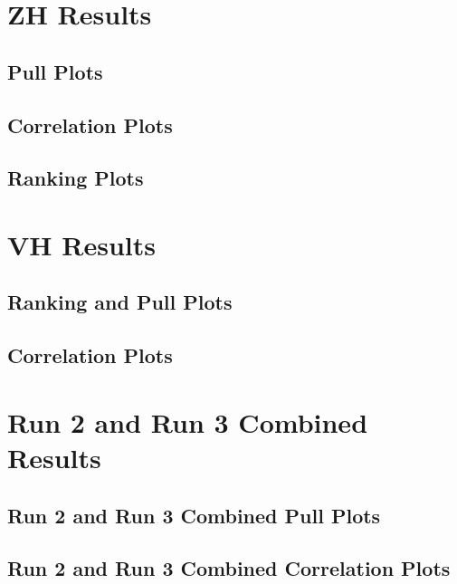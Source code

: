 \documentclass{umassthesis}          %
\begin{document}
\chapter{ZH Results}\label{app:zh_results_appendix}
\section{Pull Plots}\label{app:zh_pull_plots}

\section{Correlation Plots}\label{app:zh_correlation_plots}

\section{Ranking Plots}\label{app:zh_ranking_plots}

% 

\chapter{VH Results}\label{app:vh_results_appendix}
\section{Ranking and Pull Plots}\label{app:vh_pull_plots}

\section{Correlation Plots}\label{app:vh_correlation_plots}


\chapter{Run 2 and Run 3 Combined Results}\label{app:r2_r3_results_appendix}
\section{Run 2 and Run 3 Combined Pull Plots}\label{app:r2_r3_pull_plots}

\section{Run 2 and Run 3 Combined Correlation Plots}\label{app:r2_r3_correlation_plots}

\end{document}

